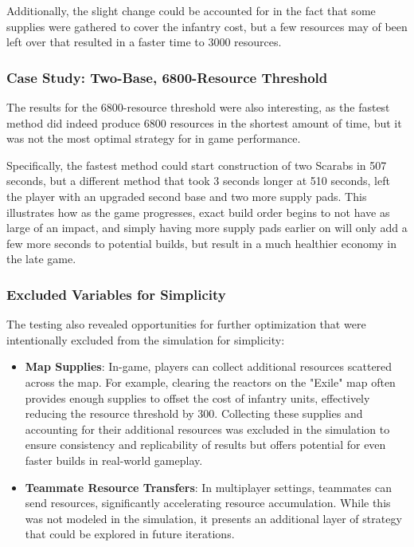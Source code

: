 \documentclass[a4paper, 12pt, english]{article}
\begin{document}
Additionally, the slight change could be accounted for in the fact that some supplies were gathered to cover the infantry cost, but a few resources may of been left over that resulted in a faster time to 3000 resources.
\newline

\subsubsection{Case Study: Two-Base, 6800-Resource Threshold}
The results for the 6800-resource threshold were also interesting, as the fastest method did indeed produce 6800 resources in the shortest amount of time, but it was not the most optimal strategy for in game performance.
\newline

Specifically, the fastest method could start construction of two Scarabs in 507 seconds, but a different method that took 3 seconds longer at 510 seconds, left the player with an upgraded second base and two more supply pads. This illustrates how as the game progresses, exact build order begins to not have as large of an impact, and simply having more supply pads earlier on will only add a few more seconds to potential builds, but result in a much healthier economy in the late game.

\subsubsection{Excluded Variables for Simplicity}
The testing also revealed opportunities for further optimization that were intentionally excluded from the simulation for simplicity:
    \begin{itemize}
    \item \textbf{Map Supplies}: In-game, players can collect additional resources scattered across the map. For example, clearing the reactors on the "Exile" map often provides enough supplies to offset the cost of infantry units, effectively reducing the resource threshold by 300. Collecting these supplies and accounting for their additional resources was excluded in the simulation to ensure consistency and replicability of results but offers potential for even faster builds in real-world gameplay.
    \item \textbf{Teammate Resource Transfers}: In multiplayer settings, teammates can send resources, significantly accelerating resource accumulation. While this was not modeled in the simulation, it presents an additional layer of strategy that could be explored in future iterations.
    \end{itemize}
\end{document}
